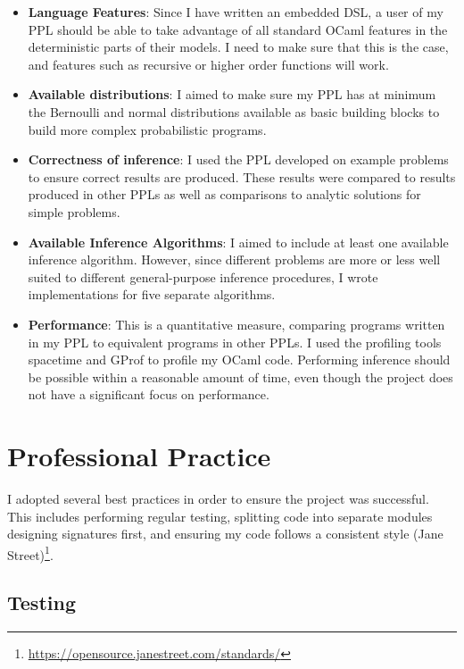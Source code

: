 \begin{itemize}
	\item \textbf{Language Features}: Since I have written an embedded DSL, a user of my PPL should be able to take advantage of all standard OCaml features in the deterministic parts of their models. I need to make sure that this is the case, and features such as recursive or higher order functions will work.
	\item \textbf{Available distributions}: I aimed to make sure my PPL has at minimum the Bernoulli and normal distributions available as basic building blocks to build more complex probabilistic programs.
	\item \textbf{Correctness of inference}: I used the PPL developed on example problems to ensure correct results are produced. These results were compared to results produced in other PPLs as well as comparisons to analytic solutions for simple problems.
	\item \textbf{Available Inference Algorithms}: I aimed to include at least one available inference algorithm. However, since different problems are more or less well suited to different general-purpose inference procedures, I wrote implementations for five separate algorithms.
	\item \textbf{Performance}: This is a quantitative measure, comparing programs written in my PPL to equivalent programs in other PPLs. I used the profiling tools spacetime and GProf to profile my OCaml code. Performing inference should be possible within a reasonable amount of time, even though the project does not have a significant focus on performance.
\end{itemize}

\section{Professional Practice}

I adopted several best practices in order to ensure the project was successful. This includes performing regular testing, splitting code into separate modules designing signatures first, and ensuring my code follows a consistent style (Jane Street)\footnote{\url{https://opensource.janestreet.com/standards/}}.

\subsection{Testing} \label{sec:prep-testing}


